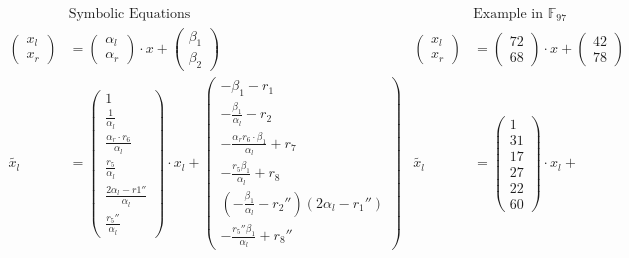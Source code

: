 \begin{align*}
%
& \text{Symbolic Equations} & & \text{Example in }\mathbb{F}_{97}\\
%
\begin{pmatrix}x_l\\x_r\end{pmatrix} &=
\begin{pmatrix}\alpha_l\\\alpha_r\end{pmatrix}
\cdot x +
\begin{pmatrix}\beta_1\\\beta_2\end{pmatrix}
&
\begin{pmatrix}x_l\\x_r\end{pmatrix} &=
\begin{pmatrix}72\\68\end{pmatrix}
\cdot x +
\begin{pmatrix}42\\78\end{pmatrix}
\\
%
\widetilde{x_l} & =
\begin{pmatrix}
  1\\
  \frac{1}{\alpha_l}\\
  \frac{\alpha_r \cdot r_6}{\alpha_l}\\
  \frac{r_5}{\alpha_l}\\
  \frac{2\alpha_l-r1''}{\alpha_l}\\
  \frac{r_5''}{\alpha_l}
\end{pmatrix}
\cdot x_l +
\begin{pmatrix}
  -\beta_1-r_1\\
  -\frac{\beta_1}{\alpha_l}-r_2\\
  -\frac{\alpha_r r_6 \cdot \beta_1}{\alpha_l} + r_7\\
  -\frac{r_5\beta_1}{\alpha_l} + r_8\\
  (-\frac{\beta_1}{\alpha_l}-r_2'')(2\alpha_l-r_1'')\\
  -\frac{r_5''\beta_1}{\alpha_l} + r_8''
\end{pmatrix}
&
\widetilde{x_l} & =
\begin{pmatrix}1\\31\\17\\27\\22\\60\end{pmatrix}
\cdot x_l +

\end{align*}
